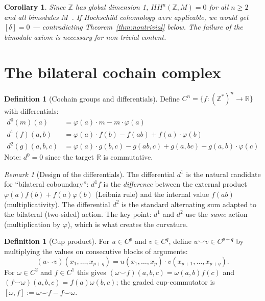 \documentclass[11pt,a4paper]{article}
\theoremstyle{plain}
\newtheorem{corollary}[theorem]{Corollary}
\theoremstyle{definition}
\newtheorem{definition}[theorem]{Definition}
\theoremstyle{remark}
\newtheorem{remark}[theorem]{Remark}
\newcommand{\ZZ}{\mathbb{Z}}
\newcommand{\RR}{\mathbb{R}}
\begin{document}
\begin{corollary}
\label{cor:hochschild-vanishes}
Since $\ZZ$ has global dimension 1, $HH^n(\ZZ, M) = 0$ for all 
$n \geq 2$ and all bimodules $M$~\cite{Weibel1994}. If Hochschild 
cohomology were applicable, we would get $[\delta] = 0$ --- 
contradicting Theorem~\ref{thm:nontrivial} below. The failure of the 
bimodule axiom is \textit{necessary} for non-trivial content.
\end{corollary}

\section{The bilateral cochain complex}
\label{sec:complex}

\begin{definition}[Cochain groups and differentials]
\label{def:complex}
Define $C^n = \{f : (\ZZ^*)^n \to \RR\}$ with differentials:
\begin{align}
d^0(m)(a) &= \varphi(a) \cdot m - m \cdot \varphi(a) 
\label{eq:d0} \\
d^1(f)(a, b) &= \varphi(a) \cdot f(b) - f(ab) + f(a) \cdot \varphi(b) 
\label{eq:d1} \\
d^2(g)(a, b, c) &= \varphi(a) \cdot g(b, c) - g(ab, c) + g(a, bc) 
- g(a, b) \cdot \varphi(c) \label{eq:d2}
\end{align}
Note: $d^0 = 0$ since the target $\RR$ is commutative.
\end{definition}

\begin{remark}[Design of the differentials]
\label{rem:design}
The differential $d^1$ is the natural candidate for ``bilateral 
coboundary'': $d^1 f$ is the \textit{difference} between the external 
product $\varphi(a)f(b) + f(a)\varphi(b)$ (Leibniz rule) and the 
internal value $f(ab)$ (multiplicativity). The differential $d^2$ is 
the standard alternating sum adapted to the bilateral (two-sided) 
action. The key point: $d^1$ and $d^2$ use the \textit{same} 
action (multiplication by $\varphi$), which is what creates the 
curvature.
\end{remark}

\begin{definition}[Cup product]
\label{def:cup}
For $u \in C^p$ and $v \in C^q$, define $u \smile v \in C^{p+q}$ by
multiplying the values on consecutive blocks of arguments:
\begin{equation*}
(u \smile v)(x_1, \dots, x_{p+q}) = u(x_1, \dots, x_p) \cdot
v(x_{p+1}, \dots, x_{p+q}).
\end{equation*}
For $\omega \in C^2$ and $f \in C^1$ this gives $(\omega \smile
f)(a,b,c) = \omega(a,b) f(c)$ and $(f \smile \omega)(a,b,c) = f(a)
\omega(b,c)$; the graded cup-commutator is $[\omega, f] := \omega
\smile f - f \smile \omega$.
\end{definition}
\end{document}
